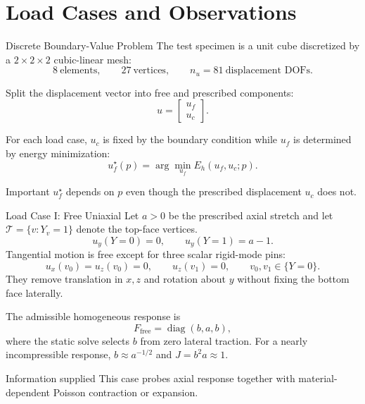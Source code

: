 \documentclass[aspectratio=169,10pt]{beamer}
\begin{document}
\section{Load Cases and Observations}

\begin{frame}{Discrete Boundary-Value Problem}
  \small
  The test specimen is a unit cube discretized by a $2\times2\times2$
  cubic-linear mesh:
  \[
    8\ \text{elements},\qquad
    27\ \text{vertices},\qquad
    n_u=81\ \text{displacement DOFs}.
  \]

  Split the displacement vector into free and prescribed components:
  \[
    u=
    \begin{bmatrix}u_f\\u_c\end{bmatrix}.
  \]

  For each load case, $u_c$ is fixed by the boundary condition while $u_f$
  is determined by energy minimization:
  \[
    u_f^\star(p)
    =
    \arg\min_{u_f} E_h(u_f,u_c;p).
  \]

  \begin{alertblock}{Important}
    $u_f^\star$ depends on $p$ even though the prescribed displacement $u_c$
    does not.
  \end{alertblock}
\end{frame}

\begin{frame}{Load Case I: Free Uniaxial}
  \small
  Let $a>0$ be the prescribed axial stretch and let
  $\mathcal T=\{v:Y_v=1\}$ denote the top-face vertices.
  \[
    u_y(Y=0)=0,
    \qquad
    u_y(Y=1)=a-1.
  \]
  Tangential motion is free except for three scalar rigid-mode pins:
  \[
    u_x(v_0)=u_z(v_0)=0,
    \qquad
    u_z(v_1)=0,
    \qquad v_0,v_1\in\{Y=0\}.
  \]
  They remove translation in $x,z$ and rotation about $y$ without fixing
  the bottom face laterally.

  The admissible homogeneous response is
  \[
    F_{\mathrm{free}}=
    \operatorname{diag}(b,a,b),
  \]
  where the static solve selects $b$ from zero lateral traction. For a nearly
  incompressible response, $b\approx a^{-1/2}$ and $J=b^2a\approx1$.

  \begin{block}{Information supplied}
    This case probes axial response together with material-dependent Poisson
    contraction or expansion.
  \end{block}
\end{frame}
\end{document}

